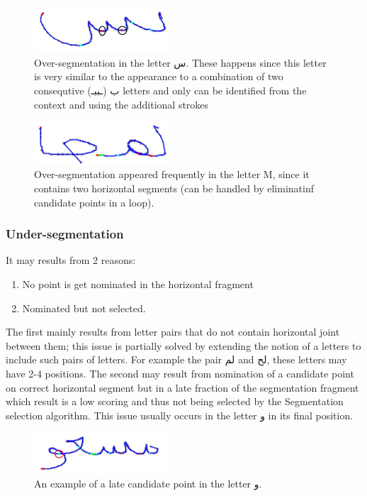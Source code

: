 \documentclass[journal,compsoc]{IEEEtran}
\begin{document}
\begin{figure}[h]
\centering
\includegraphics[width=5cm]{./figures/oversegmentation_s}
\caption{Over-segmentation in the letter س. These happens since this letter is very similar to the appearance to a combination of two consequtive ب (ـببـ) letters and only can be identified from the context and using the additional strokes }
\label{fig:oversegmentation_s}
\end{figure}

\begin{figure}[h]
\centering
\includegraphics[width=5cm]{./figures/oversegmentation_m}
\caption{Over-segmentation appeared frequently in the letter M, since it contains two horizontal segments (can be handled by eliminatinf candidate points in a loop).}
\label{fig:oversegmentation_m}
\end{figure}

\subsubsection{Under-segmentation}
It may results from 2 reasons:

\begin{enumerate}
\item No point is get nominated in the horizontal fragment
\item Nominated but not selected.
\end{enumerate}

The first mainly results from letter pairs that do not contain horizontal joint between them; this issue is partially solved by extending the notion of a letters to include such pairs of letters. For example the pair لم and لح, these letters may have 2-4 positions. The second may result from nomination of a candidate point on correct horizontal segment but in a late fraction of the segmentation fragment which result is a low scoring and thus not being selected by the Segmentation selection algorithm. This issue usually occurs in the letter و in its final position.

\begin{figure}[h]
\centering
\includegraphics[width=5cm]{./figures/undersegmentation_w}
\caption{An example of a late candidate point in the letter و.}
\label{fig:undersegmentation_w}
\end{figure}
\end{document}
